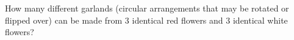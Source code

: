 How many different garlands (circular arrangements that may be rotated or flipped over) can be made from $3$ identical red flowers and $3$ identical white flowers?
